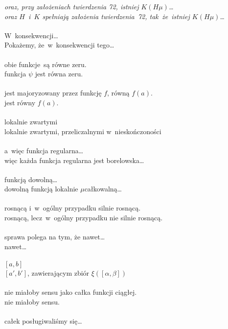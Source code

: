 \documentclass[a4paper,11pt]{article}
\begin{document}
\Jest \emph{oraz, przy założeniach twierdzenia 72, istniej
  $K( H \mu )$\ldots} \\
\Pow \emph{oraz $H$~i~$K$ spełniają założenia twierdzenia~72,
  tak~że~istniej $K( H \mu )$\ldots}\\
 \\
\Jest W~konsekwencji\ldots \\
\Pow  Pokażemy, że~w~konsekwencji tego\ldots \\
 \\
\Jest obie funkcje~są równe zeru. \\
\Pow  funkcja $\psi$ jest równa zeru. \\
 \\
\Jest jest majoryzowany przez funkcję $f$, równą $f( a )$. \\
\Pow  jest równy $f( a )$.\\
 \\
\Jest lokalnie zwartymi \\
\Pow  lokalnie zwartymi, przeliczalnymi w~nieskończoności \\
 \\
\Jest a~więc funkcja regularna\ldots \\
\Pow  więc każda funkcja regularna jest borelowska\ldots \\
 \\
\Jest funkcją dowolną\ldots \\
\Pow  dowolną funkcją lokalnie $\mu$\dywiz całkowalną\ldots \\
 \\
\Jest rosnącą i~w~ogólny przypadku silnie rosnącą. \\
\Pow  rosnącą, lecz~w~ogólny przypadku nie silnie rosnącą. \\
 \\
\Jest sprawa polega na tym, że nawet\ldots \\
\Pow  nawet\ldots \\
 \\
\Jest $[ a, b ]$ \\
\Pow  $[ a', b' ]$, zawierającym zbiór $\xi( [ \alpha, \beta ] )$ \\
 \\
\Jest nie miałoby sensu jako całka funkcji ciągłej. \\
\Pow  nie miałoby sensu. \\
 \\
\Jest całek posługiwaliśmy się\ldots \\
\end{document}
